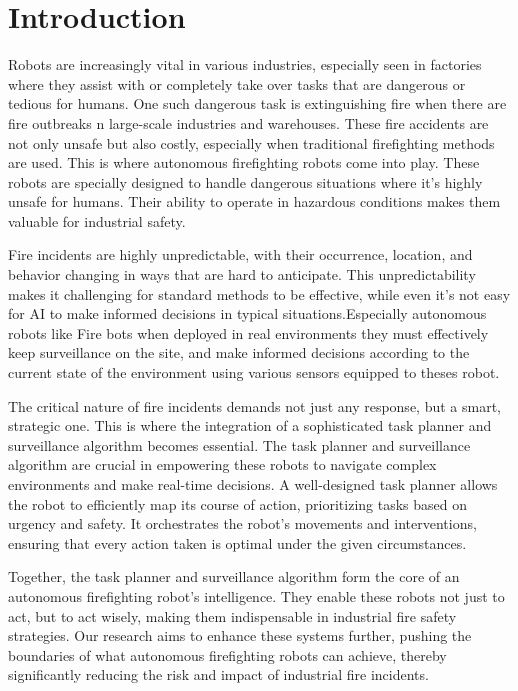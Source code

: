 \chapter{Introduction}

Robots are increasingly vital in various industries, especially seen in factories where they assist with or completely take over tasks that are dangerous or tedious for humans. One such dangerous task is extinguishing fire when there are fire outbreaks  n large-scale industries and warehouses. These fire accidents are not only unsafe but also costly, especially when traditional firefighting methods are used. This is where autonomous firefighting robots come into play. These robots are specially designed to handle dangerous situations where it's highly unsafe for humans. Their ability to operate in hazardous conditions makes them valuable for industrial safety. 

Fire incidents are highly unpredictable, with their occurrence, location, and behavior changing in ways that are hard to anticipate. This unpredictability makes it challenging for standard methods to be effective, while even it's not easy for AI to make informed decisions in typical situations.Especially autonomous robots like Fire bots when deployed in real environments they must effectively keep surveillance on the site, and make informed decisions according to the current state of the environment using various sensors equipped to theses robot.

The critical nature of fire incidents demands not just any response, but a smart, strategic one. This is where the integration of a sophisticated task planner and surveillance algorithm becomes essential. 
The task planner and surveillance algorithm are crucial in empowering these robots to navigate complex environments and make real-time decisions. A well-designed task planner allows the robot to efficiently map its course of action, prioritizing tasks based on urgency and safety. It orchestrates the robot's movements and interventions, ensuring that every action taken is optimal under the given circumstances.

Together, the task planner and surveillance algorithm form the core of an autonomous firefighting robot's intelligence. They enable these robots not just to act, but to act wisely, making them indispensable in industrial fire safety strategies. Our research aims to enhance these systems further, pushing the boundaries of what autonomous firefighting robots can achieve, thereby significantly reducing the risk and impact of industrial fire incidents.









